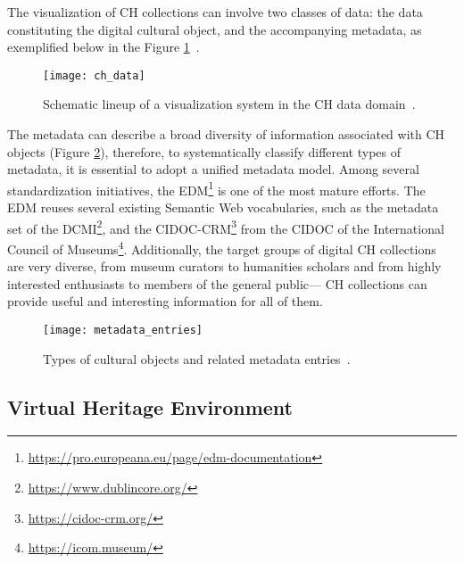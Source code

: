 The visualization of \gls{CH} collections can involve two classes of data: the data constituting the digital cultural object, and
the accompanying metadata, as exemplified below in the Figure \ref{fig:ch_data}~\cite{Windhager2019Visualization}.

\begin{figure}[h!]
    \centering
    \texttt{[image: ch\_data]}
    \caption{Schematic lineup of a visualization system in the CH data domain~\cite{Windhager2019Visualization}.}
    \label{fig:ch_data}
\end{figure}
\FloatBarrier


The metadata can describe a broad diversity of information associated
with \gls{CH} objects (Figure \ref{fig:ch_objects}), therefore, to systematically classify different types of metadata, it is essential to adopt a unified metadata model. 
Among several standardization initiatives, the \gls{EDM}\footnote{\url{https://pro.europeana.eu/page/edm-documentation}} is one of the most mature efforts. 
The \gls{EDM} reuses several existing Semantic Web vocabularies, such as the metadata set of the \gls{DCMI}\footnote{\url{https://www.dublincore.org/}}, and the
\gls{CIDOC-CRM}\footnote{\url{https://cidoc-crm.org/}} from the \gls{CIDOC} of the International Council of Museums\footnote{\url{https://icom.museum/}}. 
Additionally, the target groups of digital CH collections are very diverse, from museum curators to humanities scholars and from
highly interested enthusiasts to members of the general public— \gls{CH} collections can provide useful and interesting information for all of them. 


\begin{figure}[h!]
    \centering
    \texttt{[image: metadata\_entries]}
    \caption{Types of cultural objects and related metadata entries~\cite{Windhager2019Visualization}.}
    \label{fig:ch_objects}
\end{figure}
\FloatBarrier


\subsection{Virtual Heritage Environment}
\label{sec:virtual_heritage}

